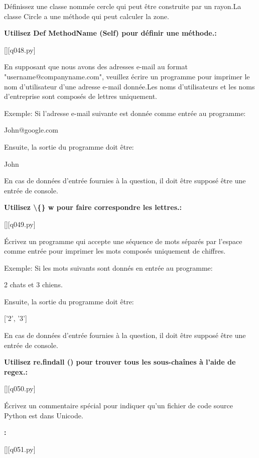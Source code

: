 \question
Définissez une classe nommée cercle qui peut être construite par un rayon.La classe Circle a une méthode qui peut calculer la zone.
\par
\textbf{Utilisez Def MethodName (Self) pour définir une méthode.:}
\renewcommand{\nomfichier}{q048.py}
\begin{solution}
    \pythonfile{\chemincode \nomfichier}[][q048.py]
\end{solution}


\question
En supposant que nous avons des adresses e-mail au format "username@companyname.com", veuillez écrire un programme pour imprimer le nom d'utilisateur d'une adresse e-mail donnée.Les noms d'utilisateurs et les noms d'entreprise sont composés de lettres uniquement.

Exemple:
Si l'adresse e-mail suivante est donnée comme entrée au programme:

John@google.com

Ensuite, la sortie du programme doit être:

John

En cas de données d'entrée fournies à la question, il doit être supposé être une entrée de console.
\par
\textbf{Utilisez \textbackslash\{\} w pour faire correspondre les lettres.:}
\renewcommand{\nomfichier}{q049.py}
\begin{solution}
    \pythonfile{\chemincode \nomfichier}[][q049.py]
\end{solution}


\question
Écrivez un programme qui accepte une séquence de mots séparés par l'espace comme entrée pour imprimer les mots composés uniquement de chiffres.

Exemple:
Si les mots suivants sont donnés en entrée au programme:

2 chats et 3 chiens.

Ensuite, la sortie du programme doit être:

['2', '3']

En cas de données d'entrée fournies à la question, il doit être supposé être une entrée de console.
\par
\textbf{Utilisez re.findall () pour trouver tous les sous-chaînes à l'aide de regex.:}
\renewcommand{\nomfichier}{q050.py}
\begin{solution}
    \pythonfile{\chemincode \nomfichier}[][q050.py]
\end{solution}


\question
Écrivez un commentaire spécial pour indiquer qu'un fichier de code source Python est dans Unicode.
\par
\textbf{:}
\renewcommand{\nomfichier}{q051.py}
\begin{solution}
    \pythonfile{\chemincode \nomfichier}[][q051.py]
\end{solution}


